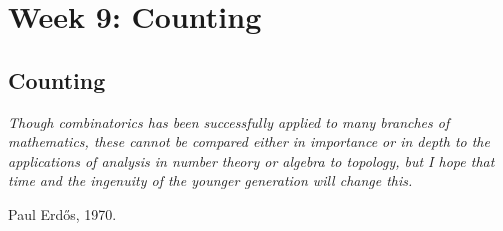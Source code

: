 \documentclass[11pt,dvipsnames]{book}
\numberwithin{equation}{section} %
\numberwithin{figure}{section} %
\numberwithin{table}{section} %
\begin{document}




\pagestyle{empty} %

 \tableofcontents %

\cleardoublepage %

\pagestyle{fancy} %




\part{Week 9: Counting}







\setcounter{chapter}{14}

\setcounter{page}{0}





\chapter{Counting}




\epigraph{\it    Though combinatorics has been successfully applied to many branches of mathematics, these cannot be compared either in importance or in depth to the applications of analysis in number theory or algebra to topology, but I hope that time and the ingenuity of the younger generation will change this.
}{Paul Erd\H{o}s, 1970.}

 
\end{document}
